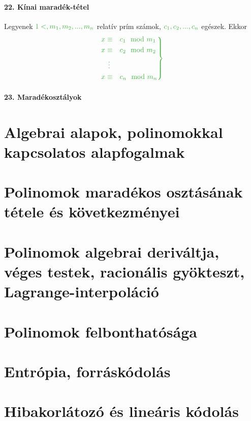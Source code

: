 \documentclass[10pt,a4paper]{article}
\renewcommand{\>}{\rightarrow}
\newcommand{\gr}[1]{\textcolor{FancsaliGreen}{#1}}
\newenvironment{m}
    {\begin{center}
    \begin{mdframed}[backgroundcolor=FancsaliBlue]
    }
    { 
    \end{mdframed}
    \end{center}
    }
\begin{document}
\paragraph{22. Kínai maradék-tétel}
\begin{m}
Legyenek $\gr{1<,m_1,m_2,...,m_n}$ relatív prím számok, $\gr{c_1,c_2,...,c_n}$ egészek. 
Ekkor
\[\gr{
\begin{rcases}
x \equiv & c_1 \mod m_1 \\
x \equiv & c_2 \mod m_2 \\
\quad \vdots & \\
x \equiv & c_n \mod m_n \\
\end{rcases}
}\]
\end{m}
\paragraph{23. Maradékosztályok}

\newpage

\section{Algebrai alapok, polinomokkal kapcsolatos alapfogalmak}
\newpage

\section{Polinomok maradékos osztásának tétele és következményei}
\newpage

\section{Polinomok algebrai deriváltja, véges testek, racionális gyökteszt, Lagrange-interpoláció}
\newpage

\section{Polinomok felbonthatósága}
\newpage

\section{Entrópia, forráskódolás}
\newpage

\section{Hibakorlátozó és lineáris kódolás}
\newpage
\end{document}
